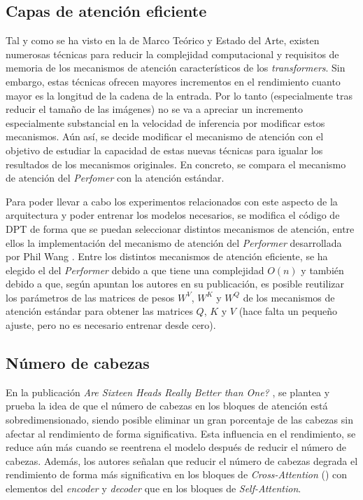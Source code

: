

\subsection{Capas de atención eficiente}

Tal y como se ha visto en la  de Marco Teórico y Estado del Arte, existen numerosas técnicas para reducir la complejidad computacional y requisitos de memoria de los mecanismos de atención característicos de los \textit{transformers}. Sin embargo, estas técnicas ofrecen mayores incrementos en el rendimiento cuanto mayor es la longitud de la cadena de la entrada. Por lo tanto (especialmente tras reducir el tamaño de las imágenes) no se va a apreciar un incremento especialmente substancial en la velocidad de inferencia por modificar estos mecanismos. Aún así, se decide modificar el mecanismo de atención con el objetivo de estudiar la capacidad de estas nuevas técnicas para igualar los resultados de los mecanismos originales. En concreto, se compara el mecanismo de atención del \textit{Perfomer} con la atención estándar.

Para poder llevar a cabo los experimentos relacionados con este aspecto de la arquitectura y poder entrenar los modelos necesarios, se modifica el código de DPT de forma que se puedan seleccionar distintos mecanismos de atención, entre ellos la implementación del mecanismo de atención del \textit{Performer} desarrollada por Phil Wang \cite{pwperformer}. Entre los distintos mecanismos de atención eficiente, se ha elegido el del \textit{Performer} debido a que tiene una complejidad $O(n)$ y también debido a que, según apuntan los autores en su publicación, es posible reutilizar los parámetros de las matrices de pesos $W^V$, $W^K$ y $W^Q$ de los mecanismos de atención estándar para obtener las matrices $Q$, $K$ y $V$ (hace falta un pequeño ajuste, pero no es necesario entrenar desde cero).

\subsection{Número de cabezas}
En la publicación \textit{Are Sixteen Heads Really Better than One?} \cite{are16headsbetterthan1}, se plantea y prueba la idea de que el número de cabezas en los bloques de atención está sobredimensionado, siendo posible eliminar un gran porcentaje de las cabezas sin afectar al rendimiento de forma significativa. Esta influencia en el rendimiento, se reduce aún más cuando se reentrena el modelo después de reducir el número de cabezas.  Además, los autores señalan que reducir el número de cabezas degrada el rendimiento de forma más significativa en los bloques de \textit{Cross-Attention} () con elementos del \textit{encoder} y \textit{decoder} que en los bloques de \textit{Self-Attention}. 

